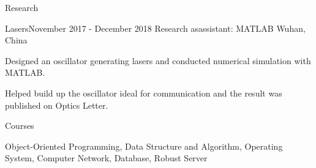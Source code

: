 \documentclass{resume} %
\begin{document}

\begin{rSection}{Research}

    \begin{rSubsection}{Lasers}{November 2017 - December 2018}
    {Research asassistant: MATLAB}
    {Wuhan, China}
    \item Designed an oscillator generating lasers and conducted numerical simulation with MATLAB.
    \item Helped build up the oscillator ideal for communication and the result was published on Optics Letter. 
    \end{rSubsection}
    
\end{rSection}


\begin{rSection}{Courses}

\item Object-Oriented Programming, Data Structure and Algorithm, Operating System, Computer Network, Database,
Robust Server

\end{rSection}



%
%





\end{document}
